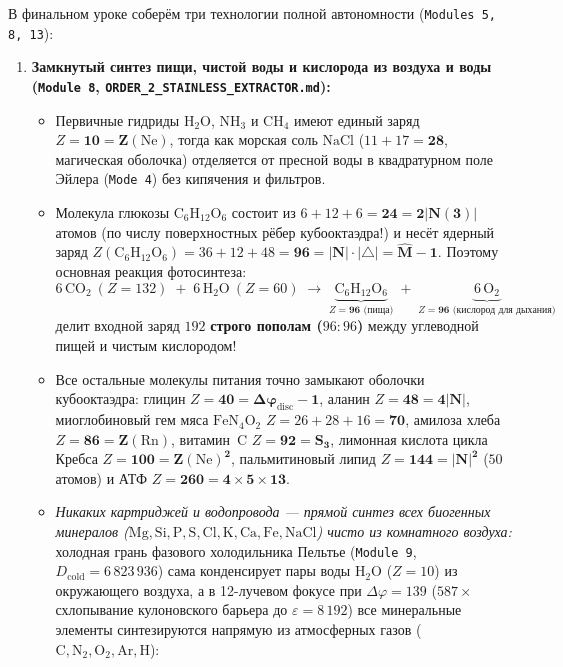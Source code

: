 В финальном уроке соберём три технологии полной автономности (\texttt{Modules~5, 8, 13}):
\begin{enumerate}[label=\textbf{\arabic*.},leftmargin=*]
\item \textbf{Замкнутый синтез пищи, чистой воды и кислорода из воздуха и воды (\texttt{Module~8}, \texttt{ORDER\_2\_STAINLESS\_EXTRACTOR.md}):}
  \begin{itemize}[noitemsep]
  \item Первичные гидриды $\mathrm{H_2O}$, $\mathrm{NH_3}$ и $\mathrm{CH_4}$ имеют единый заряд $Z = \mathbf{10 = Z(\mathrm{Ne})}$, тогда как морская соль $\mathrm{NaCl}$ ($11 + 17 = \mathbf{28}$, магическая оболочка) отделяется от пресной воды в квадратурном поле Эйлера (\texttt{Mode~4}) без кипячения и фильтров.
  \item Молекула глюкозы $\mathrm{C_6H_{12}O_6}$ состоит из $6 + 12 + 6 = \mathbf{24 = 2|N(3)|}$ атомов (по числу поверхностных рёбер кубооктаэдра!) и несёт ядерный заряд $Z(\mathrm{C_6H_{12}O_6}) = 36 + 12 + 48 = \mathbf{96 = |N|\cdot|{\triangle}| = \hat{M} - 1}$. Поэтому основная реакция фотосинтеза:
    \[
      6\,\mathrm{CO_2}\ (Z=132) \;+\; 6\,\mathrm{H_2O}\ (Z=60)
      \;\longrightarrow\;
      \underbrace{\mathrm{C_6H_{12}O_6}}_{Z = \mathbf{96}\text{ (пища)}}
      \;+\;
      \underbrace{6\,\mathrm{O_2}}_{Z = \mathbf{96}\text{ (кислород для дыхания)}}
    \]
    делит входной заряд $192$ \textbf{строго пополам ($96 : 96$)} между углеводной пищей и чистым кислородом!
  \item Все остальные молекулы питания точно замыкают оболочки кубооктаэдра: глицин $Z = \mathbf{40 = \Delta\varphi_{\mathrm{disc}}-1}$, аланин $Z = \mathbf{48 = 4|N|}$, миоглобиновый гем мяса $\mathrm{FeN_4O_2}$ $Z = 26 + 28 + 16 = \mathbf{70}$, амилоза хлеба $Z = \mathbf{86 = Z(\mathrm{Rn})}$, витамин~C $Z = \mathbf{92 = S_3}$, лимонная кислота цикла Кребса $Z = \mathbf{100 = Z(\mathrm{Ne})^2}$, пальмитиновый липид $Z = \mathbf{144 = |N|^2}$ ($50$ атомов) и АТФ $Z = \mathbf{260 = 4\times 5\times 13}$.
  \item \emph{Никаких картриджей и водопровода --- прямой синтез всех биогенных минералов ($\mathrm{Mg, Si, P, S, Cl, K, Ca, Fe, NaCl}$) чисто из комнатного воздуха:}
    холодная грань фазового холодильника Пельтье (\texttt{Module~9}, $D_{\mathrm{cold}} = 6\,823\,936$) сама конденсирует пары воды $\mathrm{H_2O}$ ($Z=10$) из окружающего воздуха, а в 12-лучевом фокусе при $\Delta\varphi = 139$ ($587\times$ схлопывание кулоновского барьера до $\varepsilon = 8\,192$) все минеральные элементы синтезируются напрямую из атмосферных газов ($\mathrm{C, N_2, O_2, Ar, H}$):

\end{itemize}
\end{enumerate}
